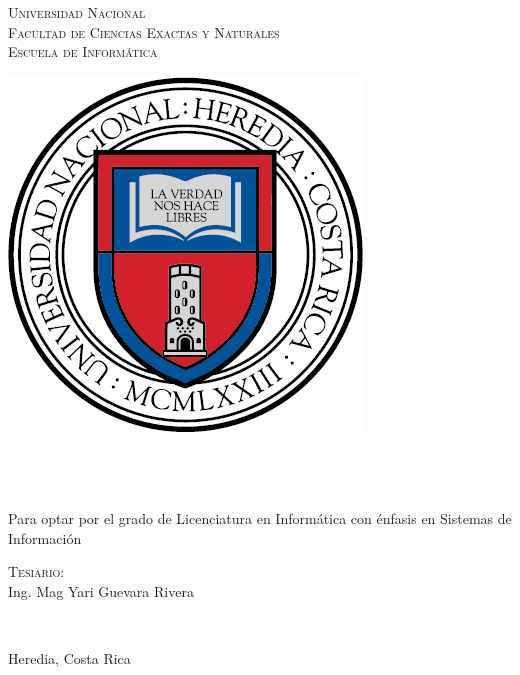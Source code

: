 \begin{titlepage}
	\begin{center}	
	\textcolor{unablue}{%
		\textsc{\LARGE Universidad Nacional}
		\\[0.5cm]
		\textsc{\Large Facultad de Ciencias Exactas y Naturales}
		\\[0.5cm]
		\textsc{\Large Escuela de Inform\'{a}tica}		
		\\[0.5cm]
	}
	\begin{center}
		\includegraphics[scale=0.5]{images/escudo.png}
	\end{center}
	
	
	\vfill
	 
		
	\HRule 
	\\[0.9cm]
	\doublespacing
	{
		\large
		\bfseries
		\thesistitle
	}
	\\[0.4cm]
	\singlespacing
	\HRule 
	\\[1.4cm]

	{
		\large Para optar por el grado de Licenciatura en Inform\'{a}tica con
		\'{e}nfasis en Sistemas de Informaci\'{o}n\\[1 cm]
	}
	
	\vfill
	 
	
	\begin{minipage}{0.45\textwidth}
		\begin{flushleft} 
			\large
			\centering
			\textsc{Tesiario:}\\
			{Ing. Mag Yari Guevara Rivera}
		\end{flushleft}
	\end{minipage}
	\\[1.6 cm]
	\vfill
	
	
	{
		\large Heredia, Costa Rica
	}
	\end{center}
\end{titlepage}